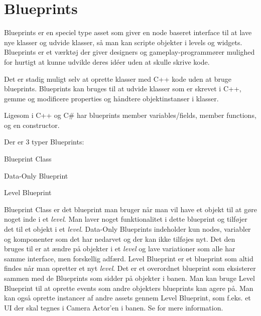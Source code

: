 \section{Blueprints}
Blueprints er en speciel type asset som giver en node baseret interface til at lave nye klasser og udvide klasser, så man kan scripte objekter i levels og widgets. Blueprints er et værktøj der giver designers og gameplay-programmører mulighed for hurtigt at kunne udvikle deres idéer uden at skulle skrive kode.

Det er stadig muligt selv at oprette klasser med C++ kode uden at bruge blueprints. Blueprints kan bruges til at udvide klasser som er skrevet i C++, gemme og modificere properties og håndtere objektinstanser i klasser.

Ligesom i C++ og C\# har blueprints member variables/fields, member functions, og en constructor.

\begin{list}{}{}
\item[Der er 3 typer Blueprints:]
\item[Blueprint Class]
\item[Data-Only Blueprint]
\item[Level Blueprint]
\end{list}

Blueprint Class er det blueprint man bruger når man vil have et objekt til at gøre noget inde i et \textit{level}. Man laver noget funktionalitet i dette blueprint og tilføjer det til et objekt i et \textit{level}. Data-Only Blueprints indeholder kun nodes, variabler og komponenter som det har nedarvet og der kan ikke tilføjes nyt. Det den bruges til er at ændre på objekter i et \textit{level} og lave variationer som alle har samme interface, men forskellig adfærd. Level Blueprint er et blueprint som altid findes når man opretter et nyt \textit{level}. Det er et overordnet blueprint som eksisterer sammen med de Blueprints som sidder på objekter i banen. Man kan bruge Level Blueprint til at oprette events som andre objekters blueprints kan agere på. Man kan også oprette instancer af andre assets gennem Level Blueprint, som f.eks. et UI der skal tegnes i Camera Actor'en i banen. Se \cite{blueprint} for mere information.
